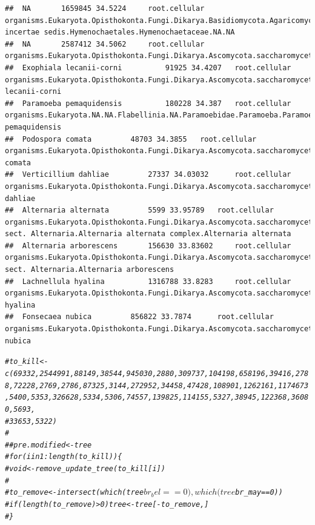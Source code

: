 \documentclass{article}\usepackage[]{graphicx}\usepackage[]{color}
\makeatletter
\newcommand{\hlcom}[1]{\textcolor[rgb]{0.678,0.584,0.686}{\textit{#1}}}%
\newenvironment{kframe}{%
 \def\at@end@of@kframe{}%
 \ifinner\ifhmode%
  \def\at@end@of@kframe{\end{minipage}}%
  \begin{minipage}{\columnwidth}%
 \fi\fi%
 \def\FrameCommand##1{\hskip\@totalleftmargin \hskip-\fboxsep
 \colorbox{shadecolor}{##1}\hskip-\fboxsep
     \hskip-\linewidth \hskip-\@totalleftmargin \hskip\columnwidth}%
 \MakeFramed {\advance\hsize-\width
   \@totalleftmargin\z@ \linewidth\hsize
   \@setminipage}}%
 {\par\unskip\endMakeFramed%
 \at@end@of@kframe}
\newenvironment{knitrout}{}{} %
\makeatother
\begin{document}
\begin{knitrout}
\begin{kframe}
\begin{verbatim}
##  NA 		 1659845 34.5224 	 root.cellular organisms.Eukaryota.Opisthokonta.Fungi.Dikarya.Basidiomycota.Agaricomycotina.Agaricomycetes.Agaricomycetes incertae sedis.Hymenochaetales.Hymenochaetaceae.NA.NA
##  NA 		 2587412 34.5062 	 root.cellular organisms.Eukaryota.Opisthokonta.Fungi.Dikarya.Ascomycota.saccharomyceta.Pezizomycotina.leotiomyceta.sordariomyceta.Sordariomycetes.Sordariomycetidae.Sordariales.Chaetomiaceae.Podospora.NA
##  Exophiala lecanii-corni 		 91925 34.4207 	 root.cellular organisms.Eukaryota.Opisthokonta.Fungi.Dikarya.Ascomycota.saccharomyceta.Pezizomycotina.leotiomyceta.Eurotiomycetes.Chaetothyriomycetidae.Chaetothyriales.Herpotrichiellaceae.Exophiala.Exophiala lecanii-corni
##  Paramoeba pemaquidensis 		 180228 34.387 	 root.cellular organisms.Eukaryota.NA.NA.Flabellinia.NA.Paramoebidae.Paramoeba.Paramoeba pemaquidensis
##  Podospora comata 		 48703 34.3855 	 root.cellular organisms.Eukaryota.Opisthokonta.Fungi.Dikarya.Ascomycota.saccharomyceta.Pezizomycotina.leotiomyceta.sordariomyceta.Sordariomycetes.Sordariomycetidae.Sordariales.Chaetomiaceae.Podospora.Podospora comata
##  Verticillium dahliae 		 27337 34.03032 	 root.cellular organisms.Eukaryota.Opisthokonta.Fungi.Dikarya.Ascomycota.saccharomyceta.Pezizomycotina.leotiomyceta.sordariomyceta.Sordariomycetes.Hypocreomycetidae.Glomerellales.Plectosphaerellaceae.Verticillium.Verticillium dahliae
##  Alternaria alternata 		 5599 33.95789 	 root.cellular organisms.Eukaryota.Opisthokonta.Fungi.Dikarya.Ascomycota.saccharomyceta.Pezizomycotina.leotiomyceta.dothideomyceta.Dothideomycetes.Pleosporomycetidae.Pleosporales.Pleosporineae.Pleosporaceae.Alternaria.Alternaria sect. Alternaria.Alternaria alternata complex.Alternaria alternata
##  Alternaria arborescens 		 156630 33.83602 	 root.cellular organisms.Eukaryota.Opisthokonta.Fungi.Dikarya.Ascomycota.saccharomyceta.Pezizomycotina.leotiomyceta.dothideomyceta.Dothideomycetes.Pleosporomycetidae.Pleosporales.Pleosporineae.Pleosporaceae.Alternaria.Alternaria sect. Alternaria.Alternaria arborescens
##  Lachnellula hyalina 		 1316788 33.8283 	 root.cellular organisms.Eukaryota.Opisthokonta.Fungi.Dikarya.Ascomycota.saccharomyceta.Pezizomycotina.leotiomyceta.sordariomyceta.Leotiomycetes.Helotiales.NA.Lachnellula.Lachnellula hyalina
##  Fonsecaea nubica 		 856822 33.7874 	 root.cellular organisms.Eukaryota.Opisthokonta.Fungi.Dikarya.Ascomycota.saccharomyceta.Pezizomycotina.leotiomyceta.Eurotiomycetes.Chaetothyriomycetidae.Chaetothyriales.Herpotrichiellaceae.Fonsecaea.Fonsecaea nubica
\end{verbatim}
\begin{alltt}
\hlcom{# to_kill <- c(69332, 2544991, 88149, 38544, 945030, 2880, 309737, 104198, 658196, 39416, 2788, 72228, 2769, 2786, 87325, 3144, 272952, 34458,  47428, 108901, 1262161, 1174673, 5400, 5353, 326628, 5334, 5306, 74557, 139825, 114155, 5327, 38945, 122368, 36080, 5693,}
\hlcom{#         33653, 5322)}
\hlcom{#         }
\hlcom{# #pre.modified <- tree}
\hlcom{# for (i in 1:length(to_kill)) \{}
\hlcom{#   void <- remove_update_tree( to_kill[i] )}
\hlcom{#   }
\hlcom{#   to_remove <- intersect( which(tree$br_bel==0), which(tree$br_may==0) )}
\hlcom{#   if (length(to_remove)>0) tree <- tree[ -to_remove, ]}
\hlcom{# \} }


\end{alltt}
\end{kframe}
\end{knitrout}
\end{document}
